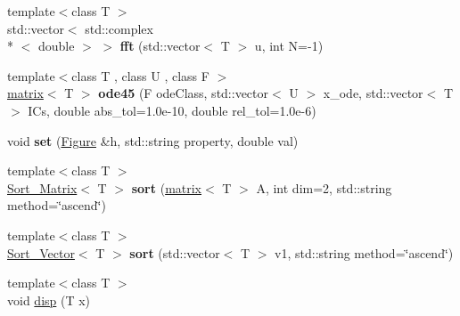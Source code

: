 \begin{DoxyCompactItemize}
\item 
\hypertarget{namespacekeycpp_a6b17b3d224192fffc838834ff736d572}{{\footnotesize template$<$class T $>$ }\\std\-::vector$<$ std\-::complex\\*
$<$ double $>$ $>$ {\bfseries fft} (std\-::vector$<$ T $>$ u, int N=-\/1)}\label{namespacekeycpp_a6b17b3d224192fffc838834ff736d572}

\item 
\hypertarget{namespacekeycpp_a880f7df231a78f912b3fb5d301c809f9}{{\footnotesize template$<$class T , class U , class F $>$ }\\\hyperlink{classkeycpp_1_1matrix}{matrix}$<$ T $>$ {\bfseries ode45} (F ode\-Class, std\-::vector$<$ U $>$ x\-\_\-ode, std\-::vector$<$ T $>$ I\-Cs, double abs\-\_\-tol=1.\-0e-\/10, double rel\-\_\-tol=1.\-0e-\/6)}\label{namespacekeycpp_a880f7df231a78f912b3fb5d301c809f9}

\item 
\hypertarget{namespacekeycpp_afcd6ae07fc18f5374868fe314f00108c}{void {\bfseries set} (\hyperlink{classkeycpp_1_1_figure}{Figure} \&h, std\-::string property, double val)}\label{namespacekeycpp_afcd6ae07fc18f5374868fe314f00108c}

\item 
\hypertarget{namespacekeycpp_a6862448bf6e09309e60a6ba7aa0caf9a}{{\footnotesize template$<$class T $>$ }\\\hyperlink{structkeycpp_1_1_sort___matrix}{Sort\-\_\-\-Matrix}$<$ T $>$ {\bfseries sort} (\hyperlink{classkeycpp_1_1matrix}{matrix}$<$ T $>$ A, int dim=2, std\-::string method=\char`\"{}ascend\char`\"{})}\label{namespacekeycpp_a6862448bf6e09309e60a6ba7aa0caf9a}

\item 
\hypertarget{namespacekeycpp_a1be4e97b99a996a01f428fd8ba048fb0}{{\footnotesize template$<$class T $>$ }\\\hyperlink{structkeycpp_1_1_sort___vector}{Sort\-\_\-\-Vector}$<$ T $>$ {\bfseries sort} (std\-::vector$<$ T $>$ v1, std\-::string method=\char`\"{}ascend\char`\"{})}\label{namespacekeycpp_a1be4e97b99a996a01f428fd8ba048fb0}

\item 
\hypertarget{namespacekeycpp_a6498ae080f530236ae3f7756f81ac78e}{{\footnotesize template$<$class T $>$ }\\void \hyperlink{namespacekeycpp_a6498ae080f530236ae3f7756f81ac78e}{disp} (T x)}\label{namespacekeycpp_a6498ae080f530236ae3f7756f81ac78e}


\end{DoxyCompactItemize}
